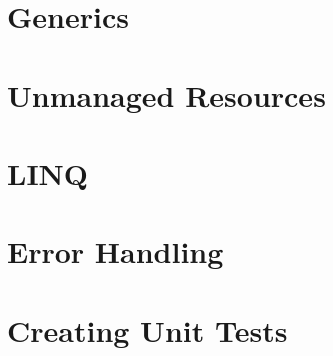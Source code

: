 \documentclass {amsart}
\begin{document}
\section{Generics}

\section{Unmanaged Resources}

\section{LINQ}

\section{Error Handling}

\section{Creating Unit Tests}
\end{document}
